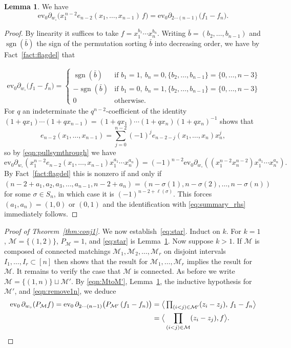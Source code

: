 \documentclass[11pt]{amsart}
\theoremstyle{definition}
\newtheorem{lem}[thm]{Lemma}
\numberwithin{equation}{section}
\newcommand{\ct}{\operatorname{ev_0}} %
\newcommand{\sgn}{\operatorname{sgn}}
\begin{document}
\begin{lem}\label{lem:nest}
We have\[
 \ct\partial_{w_{\circ}}\big(x_1^{\,n-2}e_{n-2}(x_1,\dots,x_{n-1})\,f\big)=\ct\partial_{2\cdots(n-1)}\big(f_1-f_n\big).
\]
\end{lem}
\begin{proof}
By linearity it suffices to take $f=x_1^{b_1}\cdots x_n^{b_n}$. Writing $\bar b=(b_2,\dots,b_{n-1})$ and $\sgn(\bar
b)$ the sign of the permutation sorting $\bar b$ into decreasing order, we have by Fact~\ref{fact:flagdel} that

\begin{align}\label{eq:summary_rhs}
\ct\partial_{w_{\circ}}\big(f_1-f_n\big)=
\begin{cases}
\sgn(\bar b) & \text{if } b_1=1,\ b_n=0, \{b_2,\dots,b_{n-1}\}=\{0,\dots,n-3\}\\[2pt]
-\sgn({\bar b}) & \text{if } b_1=0,\ b_n=1, \{b_2,\dots,b_{n-1}\}=\{0,\dots,n-3\}\\[2pt]
0 & \text{otherwise.}
\end{cases}
\end{align}
    For $q$ an indeterminate the $q^{n-2}$-coefficient of the identity
    $(1+qx_1)\cdots(1+qx_{n-1})=(1+qx_1)\cdots (1+qx_n)(1+qx_n)^{-1}$ shows that
    $$e_{n-2}(x_1,\ldots,x_{n-1})=\sum_{j=0}^{n-2}(-1)^je_{n-2-j}(x_1,\ldots,x_n)x_n^j,$$
    so by \eqref{eqn:pullsymthrough} we have
    $$\ct\partial_{w_\circ}(x_1^{n-2}e_{n-2}(x_1,\ldots,x_{n-1})x_1^{a_1}\cdots x_n^{a_n})=(-1)^{n-2}\ct\partial_{w_{\circ}}((x_1^{n-2}x_{n}^{n-2})x_1^{a_1}\cdots x_n^{a_n}).$$
    By Fact~\ref{fact:flagdel} this is nonzero if and only if $(n-2+a_1,a_2,a_3,\ldots,a_{n-1},n-2+a_n)=(n-\sigma(1),n-\sigma(2),\ldots,n-\sigma(n))$ for some $\sigma\in S_n$, in which case it is $(-1)^{n-2+\ell(\sigma)}$. This forces $(a_1,a_n)=(1,0)$ or $(0,1)$ and the identification with \eqref{eq:summary_rhs} immediately follows.
\end{proof}
\begin{proof}[{Proof of Theorem~\ref{thm:conj1}}]
We now establish~\eqref{eq:star}.
Induct on $k$.
For $k=1$, $\mathcal{M}=\{(1,2)\}$, $P_{\mathcal{M}}=1$, and \eqref{eq:star} is
Lemma~\ref{lem:nest}.
Now suppose $k>1$. If $\mathcal{M}$ is  composed of connected matchings $\mathcal{M}_1,\mathcal{M}_2,\ldots,\mathcal{M}_r$ on disjoint intervals $I_1,\ldots,I_r\subset [n]$ then \cite[Lemma 7.12]{sabandoalvarez2026idealsdefiningcomponentstworow} shows that the result for $\mathcal{M}_1,\ldots,\mathcal{M}_r$ implies the result for $\mathcal{M}$. It remains to verify the case that $\mathcal{M}$ is connected. As before we write $\mathcal{M}=\{(1,n)\}\sqcup \mathcal{M}'$.
By  \eqref{eqn:MtoM'}, Lemma~\ref{lem:nest}, the inductive hypothesis for $\mathcal{M}'$, and \eqref{eqn:remove1n}, we deduce
\begin{align}\label{eq:reduced}
  \ct\partial_{w_{\circ}}(P_{\mathcal{M}} f)=\ct\partial_{2\cdots(n-1)}\big(P_{\mathcal{M}'}\,(f_1-f_n)\big)&=\big\langle\textstyle\prod_{(i<j)\in\mathcal{M}'}(z_i-z_j),\,f_1-f_n\big\rangle\nonumber\\&=\big\langle \prod_{(i<j)\in \mathcal{M}}(z_i-z_j),f\big\rangle.\qedhere
\end{align}
\end{proof}
\end{document}
